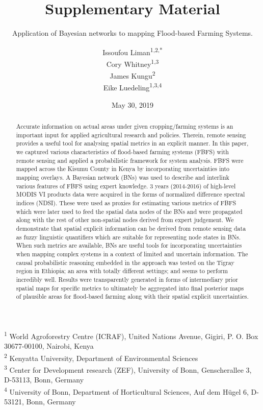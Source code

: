 \documentclass[12pt,oneside]{article}
\title{Supplementary Material}
\subtitle{Application of Bayesian networks to mapping Flood-based Farming Systems.}
\author{Issoufou Liman\textsuperscript{1,2,*} \\ Cory Whitney\textsuperscript{1,3} \\ James Kungu\textsuperscript{2} \\ Eike Luedeling\textsuperscript{1,3,4}}
\date{May 30, 2019}
\begin{document}
\maketitle
\begin{abstract}
Accurate information on actual areas under given cropping/farming systems is an important input for applied agricultural research and policies. Therein, remote sensing provides a useful tool for analysing spatial metrics in an explicit manner. In this paper, we captured various characteristics of flood-based farming systems (FBFS) with remote sensing and applied a probabilistic framework for system analysis. FBFS were mapped across the Kisumu County in Kenya by incorporating uncertainties into mapping overlays. A Bayesian network (BNs) was used to describe and interlink various features of FBFS using expert knowledge. 3 years (2014-2016) of high-level MODIS VI products data were acquired in the forms of normalized difference spectral indices (NDSI). These were used as proxies for estimating various metrics of FBFS which were later used to feed the spatial data nodes of the BNs and were propagated along with the rest of other non-spatial nodes derived from expert judgement. We demonstrate that spatial explicit information can be derived from remote sensing data as fuzzy linguistic quantifiers which are suitable for representing node states in BNs. When such metrics are available, BNs are useful tools for incorporating uncertainties when mapping complex systems in a context of limited and uncertain information. The causal probabilistic reasoning embedded in the approach was tested on the Tigray region in Ethiopia; an area with totally different settings; and seems to perform incredibly well. Results were transparently generated in forms of intermediary prior spatial maps for specific metrics to ultimately be aggregated into final posterior maps of plausible areas for flood-based farming along with their spatial explicit uncertainties.
\end{abstract}

{
\hypersetup{linkcolor=black}
\setcounter{tocdepth}{5}
\tableofcontents
}
\textsuperscript{1} World Agroforestry Centre (ICRAF), United Nations Avenue, Gigiri, P. O. Box 30677-00100, Nairobi, Kenya\\
\textsuperscript{2} Kenyatta University, Department of Environmental Sciences\\
\textsuperscript{3} Center for Development research (ZEF), University of Bonn, Genscherallee 3, D-53113, Bonn, Germany\\
\textsuperscript{4} University of Bonn, Department of Horticultural Sciences, Auf dem Hügel 6, D-53121, Bonn, Germany
\end{document}
